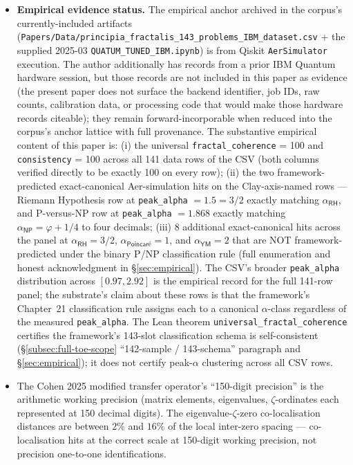 \documentclass[11pt,a4paper]{amsart}
\theoremstyle{plain}
\theoremstyle{definition}
\begin{document}
\begin{framed}
\begin{itemize}[itemsep=2pt,leftmargin=1.4em]
\item \textbf{Empirical evidence status.} The empirical anchor archived in the corpus's currently-included artifacts (\texttt{Papers/Data/principia\_fractalis\_143\_problems\_IBM\_dataset.csv} + the supplied 2025-03 \texttt{QUATUM\_TUNED\_IBM.ipynb}) is from Qiskit \texttt{AerSimulator} execution. The author additionally has records from a prior IBM Quantum hardware session, but those records are not included in this paper as evidence (the present paper does not surface the backend identifier, job IDs, raw counts, calibration data, or processing code that would make those hardware records citeable); they remain forward-incorporable when reduced into the corpus's anchor lattice with full provenance. The substantive empirical content of this paper is: (i) the universal \texttt{fractal\_coherence} = 100 and \texttt{consistency} = 100 across all 141 data rows of the CSV (both columns verified directly to be exactly 100 on every row); (ii) the two framework-predicted exact-canonical Aer-simulation hits on the Clay-axis-named rows --- Riemann Hypothesis row at \texttt{peak\_alpha} $= 1.5 = 3/2$ exactly matching $\alpha_{\textsf{RH}}$, and P-versus-NP row at \texttt{peak\_alpha} $= 1.868$ exactly matching $\alpha_{\textsf{NP}} = \varphi + 1/4$ to four decimals; (iii) 8 additional exact-canonical hits across the panel at $\alpha_{\textsf{RH}} = 3/2$, $\alpha_{\textsf{Poincar\'e}} = 1$, and $\alpha_{\textsf{YM}} = 2$ that are NOT framework-predicted under the binary P/NP classification rule (full enumeration and honest acknowledgment in \S\ref{sec:empirical}). The CSV's broader \texttt{peak\_alpha} distribution across $[0.97, 2.92]$ is the empirical record for the full 141-row panel; the substrate's claim about these rows is that the framework's Chapter~21 classification rule assigns each to a canonical $\alpha$-class regardless of the measured \texttt{peak\_alpha}. The Lean theorem \texttt{universal\_fractal\_coherence} certifies the framework's 143-slot classification schema is self-consistent (\S\ref{subsec:full-toe-scope} ``142-sample / 143-schema'' paragraph and \S\ref{sec:empirical}); it does not certify peak-$\alpha$ clustering across all CSV rows.
\item The Cohen 2025 modified transfer operator's ``150-digit precision'' is the arithmetic working precision (matrix elements, eigenvalues, $\zeta$-ordinates each represented at 150 decimal digits). The eigenvalue-$\zeta$-zero co-localisation distances are between $2\%$ and $16\%$ of the local inter-zero spacing --- co-localisation hits at the correct scale at 150-digit working precision, not precision one-to-one identifications.

\end{itemize}
\end{framed}
\end{document}
